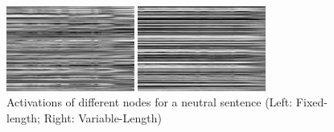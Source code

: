 \documentclass[a4paper]{article}
\begin{document}
\begin{figure}[htb]
    \begin{minipage}[b]{0.42\linewidth}
      \centering
      \centerline{\includegraphics[width=4.2cm]{rnn_out_const_neu_comp}}
    \end{minipage}
    \hfill
    \begin{minipage}[b]{0.42\linewidth}
      \centering
      \centerline{\includegraphics[width=4.2cm]{rnn_out_var_neu_comp}}
    \end{minipage}
    \caption{Activations of different nodes for a neutral sentence (Left: Fixed-length; Right: Variable-Length)}
    \label{fig:rnn_comp}
\end{figure}
\end{document}
